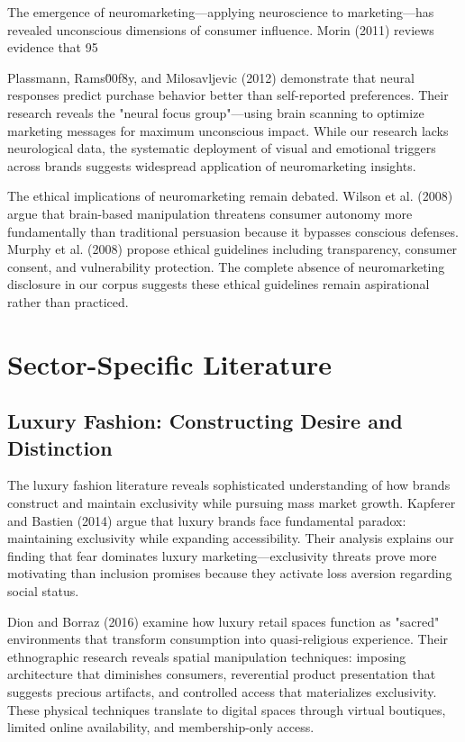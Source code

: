 The emergence of neuromarketing—applying neuroscience to marketing—has revealed unconscious dimensions of consumer influence. Morin (2011) reviews evidence that 95%

Plassmann, Rams\u00f8y, and Milosavljevic (2012) demonstrate that neural responses predict purchase behavior better than self-reported preferences. Their research reveals the "neural focus group"—using brain scanning to optimize marketing messages for maximum unconscious impact. While our research lacks neurological data, the systematic deployment of visual and emotional triggers across brands suggests widespread application of neuromarketing insights.

The ethical implications of neuromarketing remain debated. Wilson et al. (2008) argue that brain-based manipulation threatens consumer autonomy more fundamentally than traditional persuasion because it bypasses conscious defenses. Murphy et al. (2008) propose ethical guidelines including transparency, consumer consent, and vulnerability protection. The complete absence of neuromarketing disclosure in our corpus suggests these ethical guidelines remain aspirational rather than practiced.

\section{Sector-Specific Literature}
\label{sec:sector_lit}

\subsection{Luxury Fashion: Constructing Desire and Distinction}

The luxury fashion literature reveals sophisticated understanding of how brands construct and maintain exclusivity while pursuing mass market growth. Kapferer and Bastien (2014) argue that luxury brands face fundamental paradox: maintaining exclusivity while expanding accessibility. Their analysis explains our finding that fear dominates luxury marketing—exclusivity threats prove more motivating than inclusion promises because they activate loss aversion regarding social status.

Dion and Borraz (2016) examine how luxury retail spaces function as "sacred" environments that transform consumption into quasi-religious experience. Their ethnographic research reveals spatial manipulation techniques: imposing architecture that diminishes consumers, reverential product presentation that suggests precious artifacts, and controlled access that materializes exclusivity. These physical techniques translate to digital spaces through virtual boutiques, limited online availability, and membership-only access.

